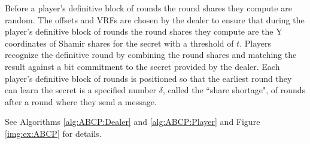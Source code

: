 \documentclass{dalcsthesis}
\begin{document}
Before a player's definitive block of rounds the round shares they compute are random. The offsets and VRFs are chosen by the dealer to ensure that during the player's definitive block of rounds the round shares they compute are the Y coordinates of Shamir shares for the secret with a threshold of $t$. Players recognize the definitive round by combining the round shares and matching the result against a bit commitment to the secret provided by the dealer. Each player's definitive block of rounds is positioned so that the earliest round they can learn the secret is a specified number $\delta$, called the ``share shortage", of rounds after a round where they send a message.

See Algorithms \ref{alg:ABCP:Dealer} and \ref{alg:ABCP:Player} and Figure \ref{img:ex:ABCP} for details.
\end{document}

